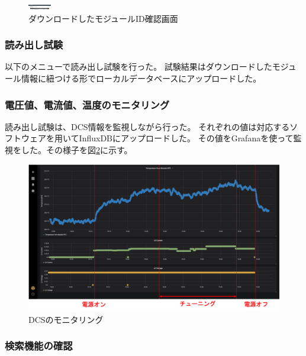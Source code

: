 \begin{figure}[bpt]\centering
\includegraphics[width=1cm]{demo_download_SCC}
\caption[ダウンロードしたモジュールID確認画面]{ダウンロードしたモジュールID確認画面}
\label{demo_download_SCC}
\end{figure}

\subsubsection{読み出し試験}
以下のメニューで読み出し試験を行った。
試験結果はダウンロードしたモジュール情報に紐つける形でローカルデータベースにアップロードした。


\subsubsection{電圧値、電流値、温度のモニタリング}
読み出し試験は、DCS情報を監視しながら行った。
それぞれの値は対応するソフトウェアを用いてInfluxDBにアップロードした。
その値をGrafanaを使って監視をした。その様子を図\ref{demo_monitor_dcs}に示す。

\begin{figure}[bpt]\centering
\includegraphics[width=12cm]{demo_monitor_dcs}
\caption[DCSのモニタリング]{DCSのモニタリング}
\label{demo_monitor_dcs}
\end{figure}

\newpage
\subsubsection{検索機能の確認}

